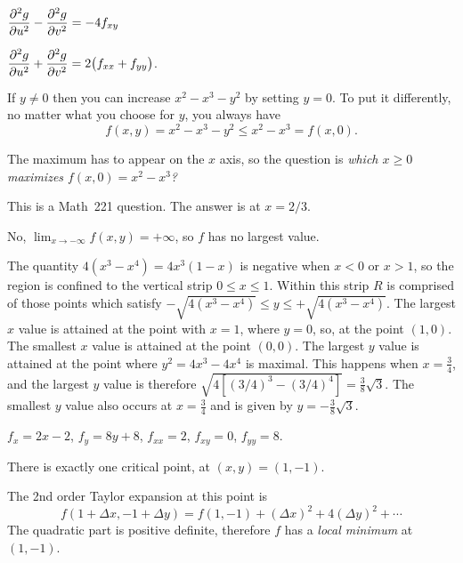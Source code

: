 $\dfrac{\partial^2 g}{\partial u^2} - \dfrac{\partial^2 g}{\partial v^2} = -4f_{xy} $
\bigskip

\item[{\bfseries(IV15.15e)}]

$\dfrac{\partial^2 g}{\partial u^2} + \dfrac{\partial^2 g}{\partial v^2} = 2\bigl(f_{xx}+f_{yy}\bigr)$.
\bigskip

\item[{\bfseries(V3.1a)}]
 If $y\neq0$ then you can increase $x^2-x^3-y^2$ by setting $y=0$.
To put it differently, no matter what you choose for $y$, you always have
\[
  f(x, y) = x^2-x^3-y^2 \leq x^2-x^3  =  f(x, 0).
\]
\bigskip

\item[{\bfseries(V3.1b)}]

The maximum has to appear on the $x$ axis, so the question is
\textit{which $x\geq0$ maximizes $f(x, 0) = x^2-x^3$?}

This is a Math~221 question.  The answer is at $x=2/3$.
\bigskip

\item[{\bfseries(V3.1c)}]

No, $\lim_{x\to-\infty} f(x, y) = +\infty$, so $f$ has no largest value.
\bigskip

\item[{\bfseries(V3.3)}]

%

The quantity $4(x^3-x^4) = 4x^3(1-x)$ is negative when $x<0$ or
$x>1$, so the region is confined to the vertical strip $0\leq x \leq
1$.  Within this strip $R$ is comprised of those points which satisfy
$-\sqrt{4(x^3-x^4)} \leq y \leq +\sqrt{4(x^3-x^4)}$.  The largest
$x$ value is attained at the point with $x=1$, where $y=0$, so, at the
point $(1,0)$.  The smallest $x$ value is attained at the point
$(0,0)$.   The largest $y$ value is attained at the point where
$y^2 = 4x^3-4x^4$ is maximal.  This happens when $x=\frac 34$, and the
largest $y$ value is therefore $\sqrt{4[(3/4)^3-(3/4)^4]} = \frac
38\sqrt{3}$.  The smallest $y$ value also occurs at $x=\frac 34$ and
is given by $y = -\frac 38 \sqrt 3$.
\bigskip

\item[{\bfseries(V6.1a)}]

$f_x = 2x-2$, $f_y = 8y+8$, $f_{xx} = 2$, $f_{xy}=0$, $f_{yy}=8$.

There is exactly one critical point, at $(x, y) = (1,-1)$.

The 2nd order Taylor expansion at this point is
\[
f(1+\Delta x, -1+\Delta y) =
f(1, -1) + (\Delta x)^2 + 4(\Delta y)^2 +\cdots
\]
The quadratic part is positive definite, therefore $f$ has a
\emph{local minimum} at $(1, -1)$.
\bigskip

